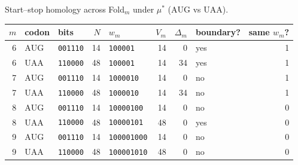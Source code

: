 Start--stop homology across Fold$_m$ under $\mu^\ast$ ($\mathrm{AUG}$ vs $\mathrm{UAA}$).

\begin{center}
\small
\setlength{\tabcolsep}{6pt}
\renewcommand{\arraystretch}{1.15}
\begin{tabular}{r l l r l r r l r}
\toprule
$m$ & codon & bits & $N$ & $w_m$ & $V_m$ & $\Delta_m$ & boundary? & same $w_m$? \\
\midrule
6 & $\mathrm{AUG}$ & \texttt{001110} & 14 & \texttt{100001} & 14 & 0 & yes & 1 \\
6 & $\mathrm{UAA}$ & \texttt{110000} & 48 & \texttt{100001} & 14 & 34 & yes & 1 \\
7 & $\mathrm{AUG}$ & \texttt{001110} & 14 & \texttt{1000010} & 14 & 0 & no & 1 \\
7 & $\mathrm{UAA}$ & \texttt{110000} & 48 & \texttt{1000010} & 14 & 34 & no & 1 \\
8 & $\mathrm{AUG}$ & \texttt{001110} & 14 & \texttt{10000100} & 14 & 0 & no & 0 \\
8 & $\mathrm{UAA}$ & \texttt{110000} & 48 & \texttt{10000101} & 48 & 0 & yes & 0 \\
9 & $\mathrm{AUG}$ & \texttt{001110} & 14 & \texttt{100001000} & 14 & 0 & no & 0 \\
9 & $\mathrm{UAA}$ & \texttt{110000} & 48 & \texttt{100001010} & 48 & 0 & no & 0 \\
\bottomrule
\end{tabular}
\end{center}

